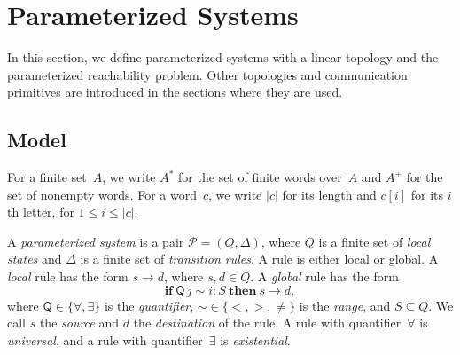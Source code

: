 \section{Parameterized Systems}
\label{sec:prelim}

In this section, we define parameterized systems with a linear topology and the
parameterized reachability problem. Other topologies and communication
primitives are introduced in the sections where they are used.

\subsection{Model}

For a finite set~$A$, we write $A^*$ for the set of finite words over~$A$ and
$A^+$ for the set of nonempty words. For a word~$c$, we write $|c|$ for its
length and $c[i]$ for its $i$th letter, for $1 \leq i \leq |c|$.

A \emph{parameterized system} is a pair $\mathcal{P} = (Q, \Delta)$, where $Q$
is a finite set of \emph{local states} and $\Delta$ is a finite set of
\emph{transition rules}. A rule is either local or global. A \emph{local} rule
has the form $s \to d$, where $s, d \in Q$. A \emph{global} rule has the form
\[
\textbf{if}\ \mathsf{Q}\, j \sim i : S\ \textbf{then}\ s \to d ,
\]
where $\mathsf{Q} \in \{\forall, \exists\}$ is the \emph{quantifier}, ${\sim}
\in \{<, >, \neq\}$ is the \emph{range}, and $S \subseteq Q$. We call $s$ the
\emph{source} and $d$ the \emph{destination} of the rule. A rule with
quantifier~$\forall$ is \emph{universal}, and a rule with quantifier~$\exists$
is \emph{existential}.


